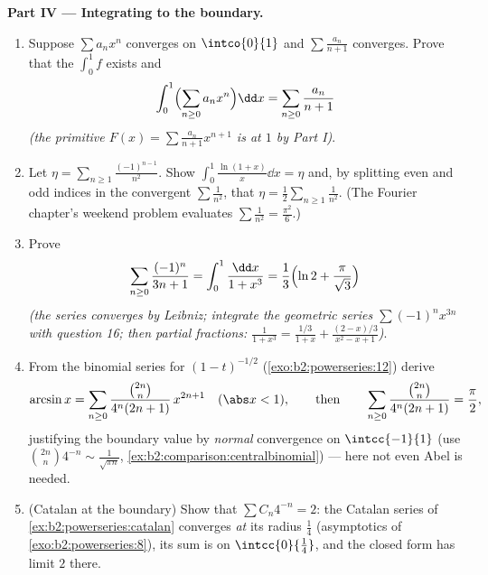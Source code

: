 \begin{problem}
\medskip
\noindent\textbf{Part IV --- Integrating to the boundary.}
\begin{enumerate}[resume]
  \item Suppose $\sum a_nx^n$ converges on $\intco{0}{1}$ and
        $\sum \frac{a_n}{n+1}$ converges. Prove that the
         $\int_0^1 f$ exists and
        \[
        \int_0^1 \Bigl(\sum_{n\geq0} a_nx^n\Bigr)\dd x
        = \sum_{n\geq0}\frac{a_n}{n+1}
        \]
        \emph{(the primitive $F(x) = \sum\frac{a_n}{n+1}x^{n+1}$
        is  at $1$ by Part I)}.
  \item Let $\eta = \sum_{n\geq1}\frac{(-1)^{n-1}}{n^2}$. Show
        $\int_0^1 \frac{\ln(1+x)}{x}\dd x = \eta$ and, by
        splitting even and odd indices in the 
        convergent $\sum \frac1{n^2}$, that $\eta =
        \frac12\sum_{n\geq1}\frac{1}{n^2}$. (The Fourier
        chapter's weekend problem evaluates
        $\sum\frac1{n^2} = \frac{\pi^2}{6}$.)
  \item Prove
        \[
        \sum_{n\geq0}\frac{(-1)^n}{3n+1}
        = \int_0^1\frac{\dd x}{1+x^3}
        = \frac13\Bigl(\ln 2 + \frac{\pi}{\sqrt3}\Bigr)
        \]
        \emph{(the series converges by Leibniz; integrate the
        geometric series $\sum(-1)^nx^{3n}$ with question 16;
        then partial fractions: $\frac{1}{1+x^3} =
        \frac{1/3}{1+x} + \frac{(2-x)/3}{x^2-x+1}$)}.
  \item From the binomial series for $(1-t)^{-1/2}$
        (\cref{exo:b2:powerseries:12}) derive
        \[
        \arcsin x = \sum_{n\geq0}
        \frac{\binom{2n}{n}}{4^n(2n+1)}\,x^{2n+1}
        \quad(\abs x < 1),
        \qquad\text{then}\qquad
        \sum_{n\geq0}\frac{\binom{2n}{n}}{4^n(2n+1)}
        = \frac\pi2 ,
        \]
        justifying the boundary value by \emph{normal}
        convergence on $\intcc{-1}{1}$ (use
        $\binom{2n}n4^{-n} \sim \frac{1}{\sqrt{\pi n}}$,
        \cref{ex:b2:comparison:centralbinomial}) --- here not
        even Abel is needed.
  \item (Catalan at the boundary) Show that $\sum C_n 4^{-n} =
        2$: the Catalan series of
        \cref{ex:b2:powerseries:catalan} converges \emph{at}
        its radius $\frac14$ (asymptotics of
        \cref{exo:b2:powerseries:8}), its sum is  on
        $\intcc{0}{\frac14}$, and the closed form has limit $2$
        there.
\end{enumerate}


\end{problem}
